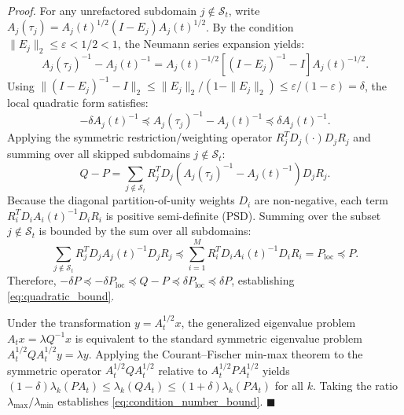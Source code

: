 \documentclass[preprint,12pt,3p]{elsarticle}
\begin{document}
\noindent\textit{Proof.}
For any unrefactored subdomain $j \notin \mathcal{S}_t$, write $A_j(\tau_j) = A_j(t)^{1/2} (I - E_j) A_j(t)^{1/2}$. By the condition $\|E_j\|_2 \le \varepsilon < 1/2 < 1$, the Neumann series expansion yields:
\begin{equation}
A_j(\tau_j)^{-1} - A_j(t)^{-1} = A_j(t)^{-1/2} \left[ (I - E_j)^{-1} - I \right] A_j(t)^{-1/2}.
\end{equation}
Using $\|(I - E_j)^{-1} - I\|_2 \le \|E_j\|_2 / (1 - \|E_j\|_2) \le \varepsilon / (1 - \varepsilon) = \delta$, the local quadratic form satisfies:
\begin{equation}
-\delta A_j(t)^{-1} \preceq A_j(\tau_j)^{-1} - A_j(t)^{-1} \preceq \delta A_j(t)^{-1}.
\end{equation}
Applying the symmetric restriction/weighting operator $R_j^T D_j (\cdot) D_j R_j$ and summing over all skipped subdomains $j \notin \mathcal{S}_t$:
\begin{equation}
Q - P = \sum_{j \notin \mathcal{S}_t} R_j^T D_j \left( A_j(\tau_j)^{-1} - A_j(t)^{-1} \right) D_j R_j.
\end{equation}
Because the diagonal partition-of-unity weights $D_i$ are non-negative, each term $R_i^T D_i A_i(t)^{-1} D_i R_i$ is positive semi-definite (PSD). Summing over the subset $j \notin \mathcal{S}_t$ is bounded by the sum over all subdomains:
\begin{equation}
\sum_{j \notin \mathcal{S}_t} R_j^T D_j A_j(t)^{-1} D_j R_j \preceq \sum_{i=1}^M R_i^T D_i A_i(t)^{-1} D_i R_i = P_{\text{loc}} \preceq P.
\end{equation}
Therefore, $-\delta P \preceq -\delta P_{\text{loc}} \preceq Q - P \preceq \delta P_{\text{loc}} \preceq \delta P$, establishing \eqref{eq:quadratic_bound}. 

Under the transformation $y = A_t^{1/2} x$, the generalized eigenvalue problem $A_t x = \lambda Q^{-1} x$ is equivalent to the standard symmetric eigenvalue problem $A_t^{1/2} Q A_t^{1/2} y = \lambda y$. Applying the Courant--Fischer min-max theorem to the symmetric operator $A_t^{1/2} Q A_t^{1/2}$ relative to $A_t^{1/2} P A_t^{1/2}$ yields $(1 - \delta) \lambda_k(P A_t) \le \lambda_k(Q A_t) \le (1 + \delta) \lambda_k(P A_t)$ for all $k$. Taking the ratio $\lambda_{\max} / \lambda_{\min}$ establishes \eqref{eq:condition_number_bound}. \hfill $\blacksquare$
\end{document}

